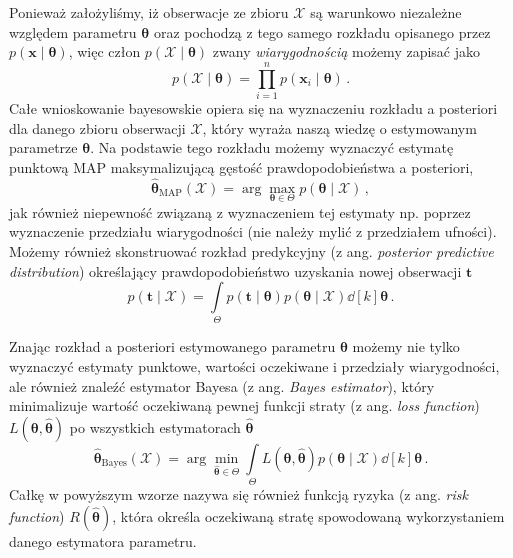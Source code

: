 \documentclass{myclass}
\numberwithin{equation}{subsection}
\begin{document}
Ponieważ założyliśmy, iż obserwacje ze zbioru \(\mathcal{X}\) są warunkowo niezależne względem
parametru \(\bm{\theta}\) oraz pochodzą z tego samego rozkładu opisanego przez \(p(\bm{x} \mid
\bm{\theta})\), więc człon \(p(\mathcal{X} \mid \bm{\theta})\) zwany \emph{wiarygodnością} możemy
zapisać jako
\begin{equation}
    p(\mathcal{X} \mid \bm{\theta}) = \prod_{i=1}^n p(\bm{x}_i \mid \bm{\theta})\,.    
\end{equation}
Całe wnioskowanie bayesowskie opiera się na wyznaczeniu rozkładu a posteriori dla danego zbioru
obserwacji \(\mathcal{X}\), który wyraża naszą wiedzę o estymowanym parametrze \(\bm{\theta}\). Na
podstawie tego rozkładu możemy wyznaczyć estymatę punktową MAP maksymalizującą gęstość
prawdopodobieństwa a posteriori, 
\begin{equation}
    \bm{\hat \theta}_\mathrm{MAP}(\mathcal{X}) = \arg \max_{\bm{\theta} \in \Theta} p(\bm{\theta} \mid \mathcal{X})\,,
\end{equation}
jak również niepewność związaną z wyznaczeniem tej estymaty np. poprzez wyznaczenie przedziału
wiarygodności (nie należy mylić z przedziałem ufności). Możemy również skonstruować rozkład
predykcyjny (z ang. \textit{posterior predictive distribution}) określający prawdopodobieństwo
uzyskania nowej obserwacji \(\bm{t}\)\
\begin{equation}
    p(\bm{t} \mid \mathcal{X}) = \int\limits_\Theta p(\bm{t} \mid \bm{\theta}) p(\bm{\theta} \mid \mathcal{X}) \dd[k]{\bm{\theta}}\,.
\end{equation}

Znając rozkład a posteriori estymowanego parametru \(\bm{\theta}\) możemy nie tylko wyznaczyć
estymaty punktowe, wartości oczekiwane i przedziały wiarygodności, ale również znaleźć estymator
Bayesa (z ang. \textit{Bayes estimator}), który minimalizuje wartość oczekiwaną pewnej funkcji
straty (z ang. \textit{loss function}) \(L(\bm{\theta}, \bm{\hat \theta})\) po wszystkich
estymatorach \(\bm{\hat \theta}\)
\begin{equation}
    \bm{\hat \theta}_\mathrm{Bayes}(\mathcal{X}) = \arg\min_{\bm{\hat \theta} \in \Theta} \int\limits_{\Theta} L(\bm{\theta}, \bm{\hat \theta}) p(\bm{\theta} \mid \mathcal{X}) \dd[k]{\bm{\theta}}\,.
\end{equation}
Całkę w powyższym wzorze nazywa się również funkcją ryzyka (z ang. \textit{risk function})
\(R(\bm{\hat \theta})\), która określa oczekiwaną stratę spowodowaną wykorzystaniem danego
estymatora parametru.
\end{document}
